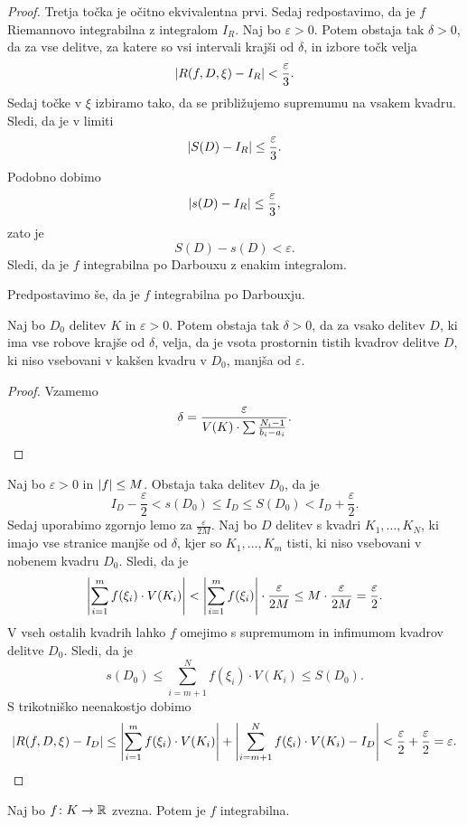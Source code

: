 \begin{proof}
Tretja točka je očitno ekvivalentna prvi. Sedaj redpostavimo, da je
$f$ Riemannovo integrabilna z integralom $I_R$. Naj bo
$\varepsilon > 0$. Potem obstaja tak $\delta > 0$, da za vse
delitve, za katere so vsi intervali krajši od $\delta$, in izbore
točk velja
\[
\left\lvert R(f,D,\xi) - I_R\right\rvert < \frac{\varepsilon}{3}.
\]
Sedaj točke v $\xi$ izbiramo tako, da se približujemo supremumu na
vsakem kvadru. Sledi, da je v limiti
\[
\left\lvert S(D) - I_R\right\rvert \leq \frac{\varepsilon}{3}.
\]
Podobno dobimo
\[
\left\lvert s(D) - I_R\right\rvert \leq \frac{\varepsilon}{3},
\]
zato je
\[
S(D) - s(D) < \varepsilon.
\]
Sledi, da je $f$ integrabilna po Darbouxu z enakim integralom.

Predpostavimo še, da je $f$ integrabilna po Darbouxju.

\begin{lema*}
Naj bo $D_0$ delitev $K$ in $\varepsilon > 0$. Potem obstaja tak
$\delta > 0$, da za vsako delitev $D$, ki ima vse robove krajše od
$\delta$, velja, da je vsota prostornin tistih kvadrov delitve $D$,
ki niso vsebovani v kakšen kvadru v $D_0$, manjša od $\varepsilon$.
\end{lema*}

\begin{proof}
Vzamemo
\[
\delta = \frac{\varepsilon}{V(K) \cdot \sum \frac{N_i-1}{b_i-a_i}}.
\qedhere
\]
\end{proof}

Naj bo $\varepsilon > 0$ in $\left\lvert f\right\rvert \leq M$. Obstaja taka delitev
$D_0$, da je
\[
I_D - \frac{\varepsilon}{2} < s(D_0) \leq
I_D \leq S(D_0) < I_D + \frac{\varepsilon}{2}.
\]
Sedaj uporabimo zgornjo lemo za $\frac{\varepsilon}{2M}$. Naj bo
$D$ delitev s kvadri $K_1,\dots,K_N$, ki imajo vse stranice manjše
od $\delta$, kjer so $K_1,\dots,K_m$ tisti, ki niso vsebovani v
nobenem kvadru $D_0$. Sledi, da je
\[
\left\lvert \sum_{i=1}^m f(\xi_i) \cdot V(K_i)\right\rvert <
\left\lvert \sum_{i=1}^m f(\xi_i)\right\rvert \cdot \frac{\varepsilon}{2M} \leq
M \cdot \frac{\varepsilon}{2M} = \frac{\varepsilon}{2}.
\]
V vseh ostalih kvadrih lahko $f$ omejimo s supremumom in infimumom
kvadrov delitve $D_0$. Sledi, da je
\[
s(D_0) \leq \sum_{i=m+1}^N f(\xi_i) \cdot V(K_i) \leq S(D_0).
\]
S trikotniško neenakostjo dobimo
\[
\left\lvert R(f,D,\xi) - I_D\right\rvert \leq
\left\lvert \sum_{i=1}^m f(\xi_i) \cdot V(K_i)\right\rvert +
\left\lvert \sum_{i=m+1}^N f(\xi_i) \cdot V(K_i) - I_D\right\rvert <
\frac{\varepsilon}{2} + \frac{\varepsilon}{2} = \varepsilon.
\qedhere
\]
\end{proof}

\begin{izrek}
Naj bo $f \colon K \to \mathbb{R}$ zvezna. Potem je $f$ integrabilna.
\end{izrek}

